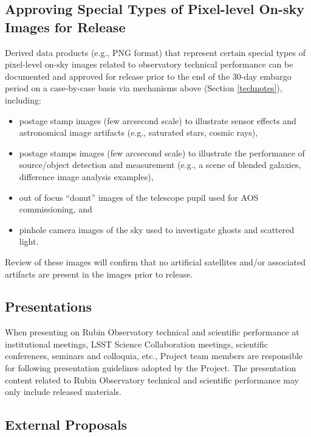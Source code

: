 \documentclass[SE,authoryear,toc]{lsstdoc}
\begin{document}
\subsection{Approving Special Types of Pixel-level On-sky Images for Release}
\label{special_classes}

Derived data products (e.g., PNG format) that represent certain special types of pixel-level on-sky images related to observatory technical performance can be documented and approved for release prior to the end of the 30-day embargo period on a case-by-case basis via mechanisms above (Section \ref{technotes}), including:

\begin{itemize}

  \item postage stamp images (few arcsecond scale) to illustrate sensor effects and astronomical image artifacts (e.g., saturated stars, cosmic rays),

  \item postage stamps images (few arcsecond scale) to illustrate the performance of source/object detection and measurement (e.g., a scene of blended galaxies, difference image analysis examples),

  \item out of focus ``donut'' images of the telescope pupil used for AOS commissioning, and

  \item pinhole camera images of the sky used to investigate ghosts and scattered light.

\end{itemize}

Review of these images will confirm that no artificial satellites and/or associated artifacts are present in the images prior to release.

\subsection{Presentations}

When presenting on Rubin Observatory technical and scientific performance at institutional meetings, LSST Science Collaboration meetings, scientific conferences, seminars and colloquia, etc., Project team members are responsible for following presentation guidelines adopted by the Project.
The presentation content related to Rubin Observatory technical and scientific performance may only include released materials.

\subsection{External Proposals}
\end{document}
